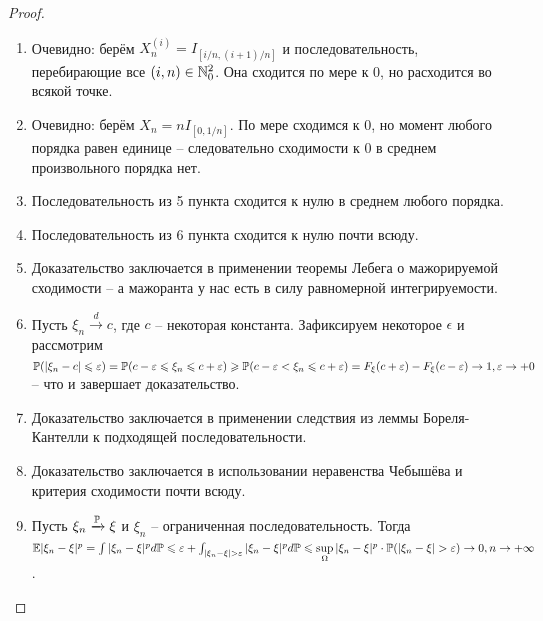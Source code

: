 \begin{proof}
\begin{enumerate}
        \item Очевидно: берём $X^{(i)}_{n} = I_{[i/n, (i + 1)/n]}$ и последовательность, перебирающие все $(i, n) \in \N_0^2$. Она сходится по мере к 0, но расходится во всякой точке.
        \item Очевидно: берём $X_n = nI_{[0, 1/n]}$. По мере сходимся к 0, но момент любого порядка равен единице -- следовательно сходимости к 0 в среднем произвольного порядка нет.
        \item Последовательность из 5 пункта сходится к нулю в среднем любого порядка.
        \item Последовательность из 6 пункта сходится к нулю почти всюду.
        \item Доказательство заключается в применении теоремы Лебега о мажорируемой сходимости -- а мажоранта у нас есть в силу равномерной интегрируемости.
        \item Пусть $\xi_n \xrightarrow{d} c$, где $c$ -- некоторая константа. Зафиксируем некоторое $\epsilon$ и рассмотрим $\P(|\xi_n - c| \leq \epsilon) = \P(c - \epsilon \leq \xi_n \leq c + \epsilon) \geq \P(c - \epsilon < \xi_n \leq c + \epsilon) = F_{\xi}(c + \epsilon) - F_{\xi}(c - \epsilon) \ra 1, \epsilon \ra +0$ -- что и завершает доказательство.
        \item Доказательство заключается в применении следствия из леммы Бореля-Кантелли к подходящей последовательности.
        \item Доказательство заключается в использовании неравенства Чебышёва и критерия сходимости почти всюду.
        \item Пусть $\xi_n \xrightarrow{\P} \xi$ и $\xi_n$ -- ограниченная последовательность. Тогда $\Ex |\xi_n - \xi|^p = \int |\xi_n - \xi|^p d\P \leq \epsilon + \int_{|\xi_n - \xi| > \epsilon} |\xi_n - \xi|^p d\P \leq \sup\limits_{\Omega} |\xi_n - \xi|^p \cdot \P(|\xi_n - \xi| > \epsilon) \ra 0, n \ra +\infty$.
    \end{enumerate}
\end{proof}

